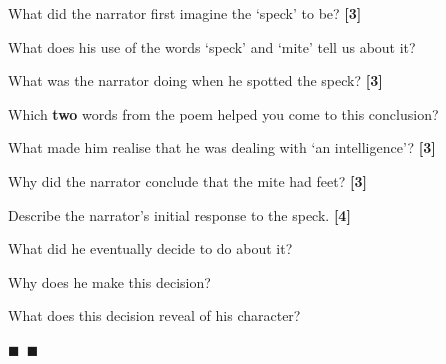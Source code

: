 \documentclass[12pt,a4paper]{article}
\newcommand{\qmarks}[1]{\hfill\textbf{[#1]}}
\begin{document}
\begin{romanenum}
    \item What did the narrator first imagine the `speck' to be? \qmarks{3}

    What does his use of the words `speck' and `mite' tell us about it?

    \item What was the narrator doing when he spotted the speck? \qmarks{3}

    Which \textbf{two} words from the poem helped you come to this conclusion?

    \item What made him realise that he was dealing with `an intelligence'? \qmarks{3}

    \item Why did the narrator conclude that the mite had feet? \qmarks{3}

    \item Describe the narrator's initial response to the speck. \qmarks{4}

    What did he eventually decide to do about it?

    Why does he make this decision?

    What does this decision reveal of his character?
\end{romanenum}

\vspace{20pt}
\begin{center}
$\blacksquare$~$\blacksquare$
\end{center}
\end{document}
